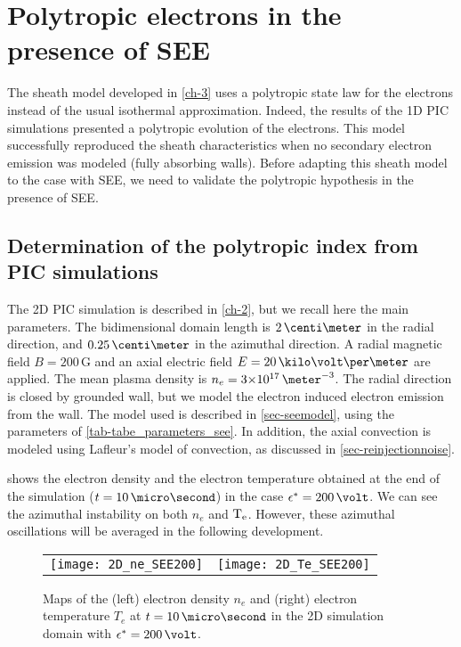 

\section{Polytropic electrons in the presence of \acs{SEE}}
\label{sec-PIC_poly}

The sheath model developed in \cref{ch-3} uses a polytropic state law for the electrons instead of the usual isothermal approximation.
Indeed, the results of the  \ac{1D} \ac{PIC} simulations presented a polytropic evolution of the electrons.
This model successfully reproduced the sheath characteristics  when no secondary electron emission was modeled (fully absorbing walls).
Before adapting this sheath model to the case with \ac{SEE}, we need to validate the polytropic hypothesis in the presence of \ac{SEE}.


\subsection{Determination of the polytropic index from PIC simulations} \label{subsec-fluid_see_polyfit}


The \ac{2D} \ac{PIC} simulation is described in \cref{ch-2}, but we recall here the main parameters.
The bidimensional domain length is $2\,\centi\meter$ in the radial direction, and $0.25\,\centi\meter$ in the azimuthal direction.
A radial magnetic field $B=200\,$G and an axial electric field $E=20\,\kilo\volt\per\meter$ are applied.
The mean plasma density is $n_e = \sn{3}{17}\,\meter^{-3}$.
The radial direction is closed by grounded wall, but we model the electron induced electron emission from the wall.
The model used is described in \cref{sec-seemodel}, using the parameters of \cref{tab-tabe_parameters_see}.
In addition, the axial convection is modeled using Lafleur's model of convection, as discussed in \cref{sec-reinjectionnoise}.

 shows the electron density and the electron temperature obtained at the end of the simulation ($t=10\,\micro\second$) in the case $\crover=200\,\volt$.
We can see the azimuthal instability on both $n_e$ and $\mathrm{T_e}$.
However, these azimuthal oscillations will be averaged in the following development. 


\begin{figure}[!htb]
  \centering
  \begin{tabular}{@{} c c}
    \texttt{[image: 2D\_ne\_SEE200]} &
    \texttt{[image: 2D\_Te\_SEE200]} \\
  \end{tabular}
  \caption{Maps of the (left) electron density $n_e$ and (right) electron temperature $T_e$ at $t=10\,\micro\second$ in the \acs{2D} simulation domain with $\crover=200\,\volt$.}
  \label{fig-2DneTe}
\end{figure}



